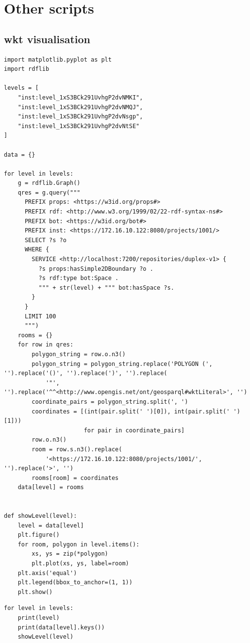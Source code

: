 \chapter{Other scripts}

\section{\acs{wkt} visualisation}
\label{sec:wktVisualisation}
\begin{verbatim}
import matplotlib.pyplot as plt
import rdflib

levels = [
    "inst:level_1xS3BCk291UvhgP2dvNMKI",
    "inst:level_1xS3BCk291UvhgP2dvNMQJ",
    "inst:level_1xS3BCk291UvhgP2dvNsgp",
    "inst:level_1xS3BCk291UvhgP2dvNtSE"
]

data = {}

for level in levels:
    g = rdflib.Graph()
    qres = g.query("""
      PREFIX props: <https://w3id.org/props#>
      PREFIX rdf: <http://www.w3.org/1999/02/22-rdf-syntax-ns#>
      PREFIX bot: <https://w3id.org/bot#>
      PREFIX inst: <https://172.16.10.122:8080/projects/1001/>
      SELECT ?s ?o
      WHERE {
        SERVICE <http://localhost:7200/repositories/duplex-v1> {
          ?s props:hasSimple2DBoundary ?o .
          ?s rdf:type bot:Space .
          """ + str(level) + """ bot:hasSpace ?s.
        }
      }
      LIMIT 100
      """)
    rooms = {}
    for row in qres:
        polygon_string = row.o.n3()
        polygon_string = polygon_string.replace('POLYGON (', '').replace('()', '').replace(')', '').replace(
            '"', '').replace('^^<http://www.opengis.net/ont/geosparql#wktLiteral>', '')
        coordinate_pairs = polygon_string.split(', ')
        coordinates = [(int(pair.split(' ')[0]), int(pair.split(' ')[1]))
                       for pair in coordinate_pairs]
        row.o.n3()
        room = row.s.n3().replace(
            '<https://172.16.10.122:8080/projects/1001/', '').replace('>', '')
        rooms[room] = coordinates
    data[level] = rooms


def showLevel(level):
    level = data[level]
    plt.figure()
    for room, polygon in level.items():
        xs, ys = zip(*polygon)
        plt.plot(xs, ys, label=room)
    plt.axis('equal')
    plt.legend(bbox_to_anchor=(1, 1))
    plt.show()
\end{verbatim}

\begin{verbatim}
for level in levels:
    print(level)
    print(data[level].keys())
    showLevel(level)
\end{verbatim}

